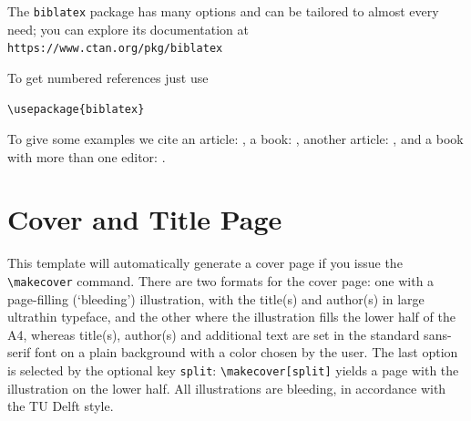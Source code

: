 The \texttt{biblatex} package has many options and can be tailored to almost
every need; you can explore its documentation at
\texttt{https://www.ctan.org/pkg/biblatex}

To get numbered references just use
\begin{verbatim}
\usepackage{biblatex}

\end{verbatim}

To give some examples we cite an article: \cite{Einstein1906},
a book: \cite{MR1039321}, another article: \cite{MR3860876},
and a book with more than one editor: \cite{MR3204729}.




\section{Cover and Title Page}

This template will automatically generate a cover page if you issue the \verb|\makecover| command. There are two formats for the cover page: one with a page-filling (`bleeding')
illustration, with the title(s) and author(s) in large ultrathin typeface, and the other where the illustration fills the lower half of the A4, whereas title(s), author(s) and additional
text are set in the standard sans-serif font on a plain background with a color chosen by the user. The last option is selected by the optional key \texttt{split}: \verb|\makecover[split]| yields
a page with the illustration on the lower half. All illustrations are bleeding, in accordance with the TU Delft style.

